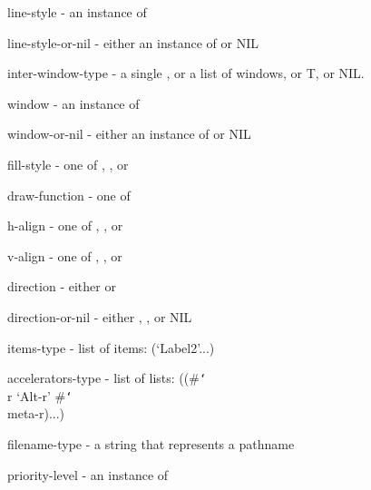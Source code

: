 \begin{group}
\begin{description}
\item[] {\sc line-style} - an instance of 

\item[] {\sc line-style-or-nil} - either an instance of  or NIL

\item[] {\sc inter-window-type} - a single , or a list of
windows, or T, or NIL.

\item[] {\sc window} - an instance of 

\item[] {\sc window-or-nil} - either an instance of  or NIL

\item[] {\sc fill-style} - one of , , or 

{\sc draw-function} - one of 

\item[] {\sc h-align} - one of , , or 

\item[] {\sc v-align} - one of , , or 

\item[] {\sc direction} - either  or 

\item[] {\sc direction-or-nil} - either , , or NIL

\item[] {\sc items-type} - list of items: (`Label2'...)

\item[] {\sc accelerators-type} - list of lists: ((\#{\tt\char`\\}r `Alt-r' \#{\tt\char`\\}meta-r)...)

\item[] {\sc filename-type} - a string that represents a pathname

\item[] {\sc priority-level} - an instance of 

\end{description}
\end{group}




